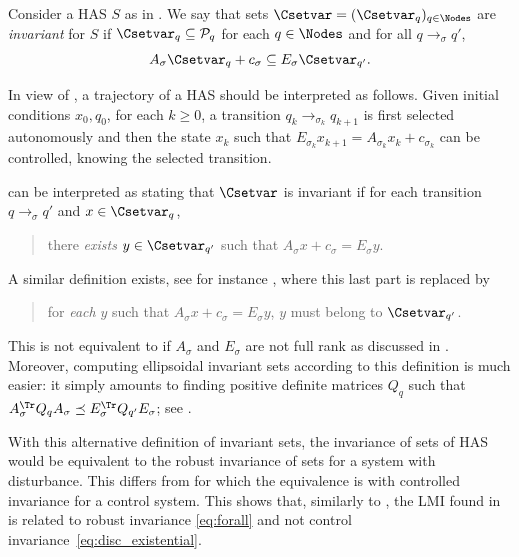 \documentclass[11pt,twoside,a4paper,openright]{uclouvain-thesis}
\newcommand{\tr}{\to}
\newcommand{\trs}[1][\sigma]{\tr_{#1}}
\newcommand{\Ps}{\mathcal{P}}
\newcommand{\sys}{S}
\newcommand{\dtahas}{HAS}
\begin{document}
\begin{mydef}[Invariant sets for a \dtahas{}]
  \label{def:is}
  Consider a \dtahas{} $\sys$ as in .
  We say that sets $\Csetvar = (\Csetvar_q)_{q \in \Nodes}$ are \emph{invariant} for $\sys$ if
  $\Csetvar_q \subseteq \Ps_q$ for each $q \in \Nodes$ and
  for all $q \trs q'$,
  \begin{equation}
    \label{eq:isdtahas}
    A_\sigma \Csetvar_{q} + c_\sigma \subseteq E_\sigma \Csetvar_{q'}.
  \end{equation}
\end{mydef}

In view of , a trajectory of a \dtahas{} should be interpreted as follows.
Given initial conditions $x_0, q_0$, for each $k \ge 0$, a transition $q_k \trs[\sigma_{k}] q_{k+1}$
is first selected autonomously and then the state $x_k$ such that $E_{\sigma_{k}} x_{k+1} = A_{\sigma_{k}} x_k + c_{\sigma_{k}}$ can be controlled, knowing the selected transition.


\begin{myrem}
  \label{rem:descriptor}
   can be interpreted as stating that $\Csetvar$ is invariant if for each transition $q \trs q'$ and $x \in \Csetvar_q$,
  \begin{quote}
    there \emph{exists} $y \in \Csetvar_{q'}$ such that $A_\sigma x + c_\sigma = E_\sigma y$.
  \end{quote}
  A similar definition exists, see for instance \cite{liberzon2012switched},
  where this last part is replaced by
  \begin{quote}
    for \emph{each} $y$ such that $A_\sigma x + c_\sigma = E_\sigma y$, $y$ must belong to $\Csetvar_{q'}$.
  \end{quote}
  This is not equivalent to  if $A_\sigma$ and $E_\sigma$ are not full rank
  as discussed in .
  Moreover, computing ellipsoidal invariant sets according to this definition is much easier: it simply amounts to finding
  positive definite matrices $Q_q$ such that $A_\sigma^\Tr Q_q A_\sigma \preceq E_\sigma^\Tr Q_{q'} E_\sigma$; see \cite{owens1985consistency}.

  With this alternative definition of invariant sets, the invariance of sets of \dtahas{} would be equivalent to
  the robust invariance of sets for a system with disturbance.
  This differs from  for which the equivalence is with controlled invariance for a control system.
  This shows that, similarly to \cite{henrion2014convex, korda2014convex, korda2013inner},
  the LMI found in \cite{owens1985consistency} is related to robust invariance \eqref{eq:forall}
  and not control invariance~\eqref{eq:disc_existential}.
\end{myrem}
\end{document}
